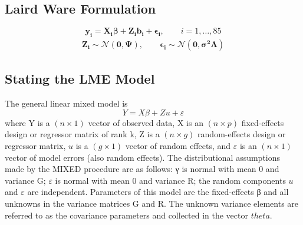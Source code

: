 \documentclass[MAIN.tex]{subfiles}
\begin{document}
\subsection{Laird Ware Formulation}
\begin{equation*}
\boldsymbol{y_{i}} = \boldsymbol{X_{i}\beta}  + \boldsymbol{Z_{i}b_{i}} + \boldsymbol{\epsilon_{i}}, \qquad i=1,\dots,85
\end{equation*}
\begin{eqnarray*}
	\boldsymbol{Z_{i}} \sim \mathcal{N}(\boldsymbol{0,\Psi}),\qquad
	\boldsymbol{\epsilon_{i}} \sim \mathcal{N}(\boldsymbol{0,\sigma^2\Lambda})
\end{eqnarray*}





\subsection{Stating the LME Model}
The general linear mixed
model is
\[
Y = X\beta + Zu + \varepsilon\]
where Y is a $(n\times1)$ vector of observed data, X is an $(n\times p)$ fixed-effects design or regressor matrix of rank
k, Z is a $(n \times g)$ random-effects design or regressor matrix, $u$ is a $(g \times 1)$ vector of random effects, and $\varepsilon$ is
an $(n\times1)$ vector of model errors (also random effects). The distributional assumptions made by the MIXED
procedure are as follows: γ is normal with mean 0 and variance G; $\varepsilon$ is normal with mean 0 and variance
R; the random components $u$ and $\varepsilon$ are independent. Parameters of this model are the fixed-effects β and
all unknowns in the variance matrices G and R. The unknown variance elements are referred to as the
covariance parameters and collected in the vector $theta$.
\end{document}
